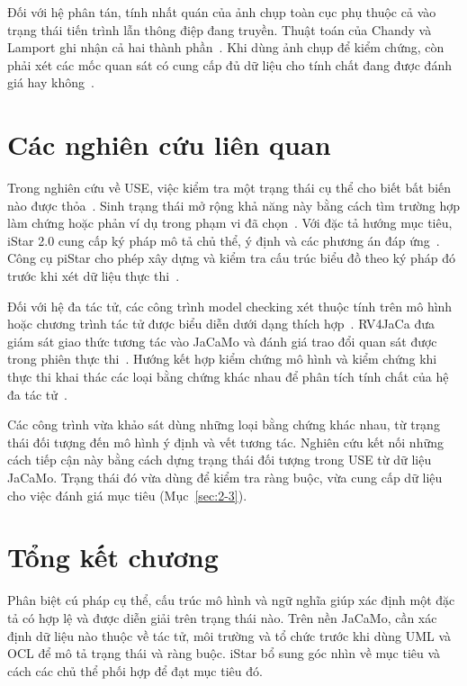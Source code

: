 \documentclass[12pt,a4paper,oneside]{extreport}
\begin{document}
Đối với hệ phân tán, tính nhất quán của ảnh chụp toàn cục phụ thuộc cả vào trạng thái tiến trình lẫn thông điệp đang truyền. Thuật toán của Chandy và Lamport ghi nhận cả hai thành phần~\cite{ref-21}. Khi dùng ảnh chụp để kiểm chứng, còn phải xét các mốc quan sát có cung cấp đủ dữ liệu cho tính chất đang được đánh giá hay không~\cite{ref-23}.

\section{Các nghiên cứu liên quan}\label{sec:1-7}

Trong nghiên cứu về USE, việc kiểm tra một trạng thái cụ thể cho biết bất biến nào được thỏa~\cite{ref-4}. Sinh trạng thái mở rộng khả năng này bằng cách tìm trường hợp làm chứng hoặc phản ví dụ trong phạm vi đã chọn~\cite{ref-16}. Với đặc tả hướng mục tiêu, iStar 2.0 cung cấp ký pháp mô tả chủ thể, ý định và các phương án đáp ứng~\cite{ref-12}. Công cụ piStar cho phép xây dựng và kiểm tra cấu trúc biểu đồ theo ký pháp đó trước khi xét dữ liệu thực thi~\cite{ref-41}.

Đối với hệ đa tác tử, các công trình model checking xét thuộc tính trên mô hình hoặc chương trình tác tử được biểu diễn dưới dạng thích hợp~\cite{ref-22}. RV4JaCa đưa giám sát giao thức tương tác vào JaCaMo và đánh giá trao đổi quan sát được trong phiên thực thi~\cite{ref-24}. Hướng kết hợp kiểm chứng mô hình và kiểm chứng khi thực thi khai thác các loại bằng chứng khác nhau để phân tích tính chất của hệ đa tác tử~\cite{ref-25}.

Các công trình vừa khảo sát dùng những loại bằng chứng khác nhau, từ trạng thái đối tượng đến mô hình ý định và vết tương tác. Nghiên cứu kết nối những cách tiếp cận này bằng cách dựng trạng thái đối tượng trong USE từ dữ liệu JaCaMo. Trạng thái đó vừa dùng để kiểm tra ràng buộc, vừa cung cấp dữ liệu cho việc đánh giá mục tiêu (Mục~\ref{sec:2-3}).

\section{Tổng kết chương}\label{sec:1-8}

Phân biệt cú pháp cụ thể, cấu trúc mô hình và ngữ nghĩa giúp xác định một đặc tả có hợp lệ và được diễn giải trên trạng thái nào. Trên nền JaCaMo, cần xác định dữ liệu nào thuộc về tác tử, môi trường và tổ chức trước khi dùng UML và OCL để mô tả trạng thái và ràng buộc. iStar bổ sung góc nhìn về mục tiêu và cách các chủ thể phối hợp để đạt mục tiêu đó.
\end{document}
